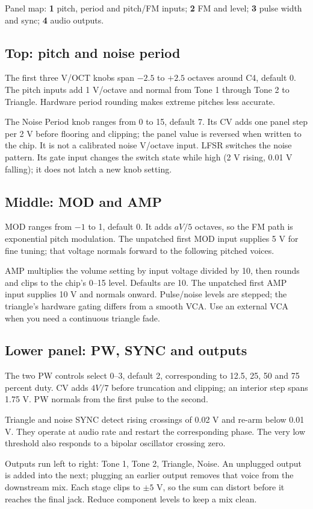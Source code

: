 Panel map: \textbf{1} pitch, period and pitch/FM inputs;
\textbf{2} FM and level;
\textbf{3} pulse width and sync;
\textbf{4} audio outputs.

\subsection{Top: pitch and noise period}
The first three V/OCT knobs span $-2.5$ to $+2.5$ octaves around C4, default
0. The pitch inputs add 1 V/octave and normal from Tone 1 through Tone 2 to
Triangle. Hardware period rounding makes extreme pitches less accurate.

The Noise Period knob ranges from 0 to 15, default 7. Its CV adds one panel
step per 2 V before flooring and clipping; the panel value is reversed when
written to the chip. It is not a calibrated noise V/octave input. LFSR
switches the noise pattern. Its gate input changes the switch state while
high (2 V rising, 0.01 V falling); it does not latch a new knob setting.
\subsection{Middle: MOD and AMP}
MOD ranges from $-1$ to 1, default 0. It adds $aV/5$ octaves, so the FM path
is exponential pitch modulation. The unpatched first MOD input supplies 5 V
for fine tuning; that voltage normals forward to the following pitched voices.

AMP multiplies the volume setting by input voltage divided by 10, then rounds
and clips to the chip's 0--15 level. Defaults are 10. The unpatched first
AMP input supplies 10 V and normals onward. Pulse/noise levels are stepped;
the triangle's hardware gating differs from a smooth VCA. Use an external
VCA when you need a continuous triangle fade.
\subsection{Lower panel: PW, SYNC and outputs}
The two PW controls select 0--3, default 2, corresponding to 12.5, 25, 50 and
75 percent duty. CV adds $4V/7$ before truncation and clipping; an interior
step spans 1.75 V. PW normals from the first pulse to the second.

Triangle and noise SYNC detect rising crossings of 0.02 V and re-arm below
0.01 V. They operate at audio rate and restart the corresponding phase.
The very low threshold also responds to a bipolar oscillator crossing zero.

Outputs run left to right: Tone 1, Tone 2, Triangle, Noise. An unplugged
output is added into the next; plugging an earlier output removes that voice
from the downstream mix. Each stage clips to $\pm5$ V, so the sum can distort
before it reaches the final jack. Reduce component levels to keep a mix clean.
